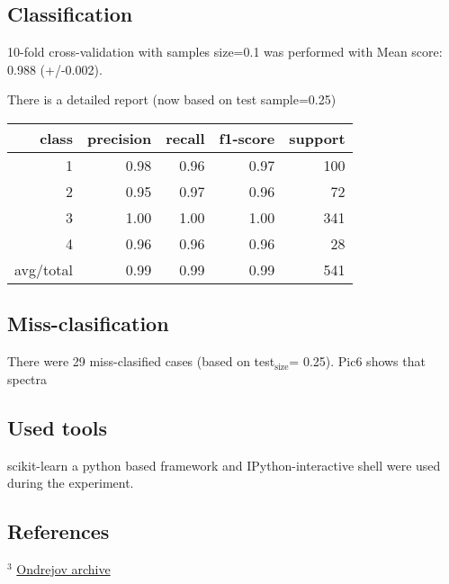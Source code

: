 \documentclass[11pt]{article}
\begin{document}
\subsection{Classification}
\label{sec-1.6}

   10-fold cross-validation with samples size=0.1 was performed with
   Mean score: 0.988 (+/-0.002).

   
   There is a detailed report (now based on test sample=0.25)
   

\begin{center}
\begin{tabular}{rrrrr}
     class  &  precision  &  recall  &  f1-score  &  support  \\
\hline
         1  &       0.98  &    0.96  &      0.97  &      100  \\
         2  &       0.95  &    0.97  &      0.96  &       72  \\
         3  &       1.00  &    1.00  &      1.00  &      341  \\
         4  &       0.96  &    0.96  &      0.96  &       28  \\
\hline
 avg/total  &       0.99  &    0.99  &      0.99  &      541  \\
\end{tabular}
\end{center}



\subsection{Miss-clasification}
\label{sec-1.7}

   There were 29 miss-clasified cases (based on test$_{\mathrm{size}}$= 0.25). Pic6
   shows that spectra

   
   
\subsection{Used tools}
\label{sec-1.8}

   scikit-learn a python based framework and IPython-interactive shell
   were used during the experiment.

\subsection{References}
\label{sec-1.9}

$^{3}$ \href{http://physics.muni.cz/~ssa/archive/}{Ondrejov archive}
\end{document}
